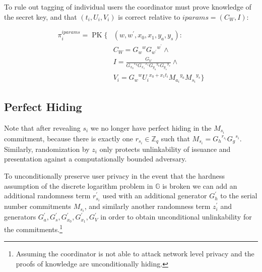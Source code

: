 \documentclass{article}
\begin{document}
To rule out tagging of individual users the coordinator must prove knowledge of the secret key, and that $(t_i, U_i, V_i)$ is correct relative to $\mathit{iparams}=(C_{W}, I)$:

\begin{align*}
\pi_{i}^{\mathit{iparams}}=\operatorname{PK}\{ & (w, w^{\prime}, x_{0}, x_{1}, y_a, y_s): \\
&C_{W}={G_{w}}^{w} {G_{w^{\prime}}}^{w^\prime} \land \\
&I=\frac{G_{V}}{{G_{x_{0}}}^{x_0} {G_{x_1}}^{x_1} {G_{y_a}}^{y_a} {G_{y_s}}^{y_s}} \land \\
&V_i={G_w}^{w}{U_i}^{x_{0}+x_{1}t_i} {M_{a_i}}^{y_a} {M_{s_i}}^{y_s}
\}
\end{align*}

\subsection{Perfect Hiding}

Note that after revealing $s_i$ we no longer have perfect hiding in the $M_{s_i}$ commitment, because there is exactly one $r_{s_i} \in \mathbb{Z}_q$ such that $M_{s_i} = {G_h}^{r_{s_i}} {G_g}^{s_i}$. Similarly, randomization by $z_i$ only protects unlinkability of issuance and presentation against a computationally bounded adversary.

To unconditionally preserve user privacy in the event that the hardness assumption of the discrete logarithm problem in $\mathbb{G}$ is broken we can add an additional randomness term $r_{s_i}^{\prime}$ used with an additional generator $G_h^{\prime}$ to the serial number commitments $M_{s_i}$, and similarly another randomness term $z_i^{\prime}$ and generators $G_a^{\prime}, G_s^{\prime}, G_{x_0}^{\prime}, G_{x_1}^{\prime}, G_V^{\prime}$ in order to obtain unconditional unlinkability for the commitments.\footnote{Assuming the coordinator is not able to attack network level privacy and the proofs of knowledge are unconditionally hiding.}


\printbibliography
\end{document}
